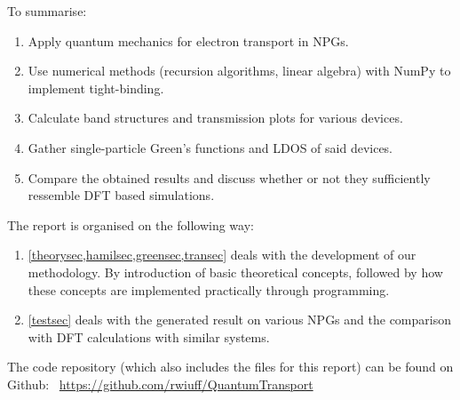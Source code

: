 To summarise:
\begin{enumerate}
	\item Apply quantum mechanics for electron transport in NPGs.
	\item Use numerical methods (recursion algorithms, linear algebra) with NumPy to implement tight-binding.
	\item Calculate band structures and transmission plots for various devices.
	\item Gather single-particle Green’s functions and LDOS of said devices.
	\item Compare the obtained results and discuss whether or not they sufficiently ressemble DFT based simulations.
\end{enumerate}
The report is organised on the following way:
\begin{enumerate}
	\item \cref{theorysec,hamilsec,greensec,transec} deals with the development of our methodology. By introduction of basic theoretical concepts, followed by how these concepts are implemented practically through programming.
	\item \cref{testsec} deals with the generated result on various NPGs and the comparison with DFT calculations with similar systems.
\end{enumerate}
The code repository (which also includes the \latex files for this report) can be found on Github: \faGithub \ \url{https://github.com/rwiuff/QuantumTransport}
